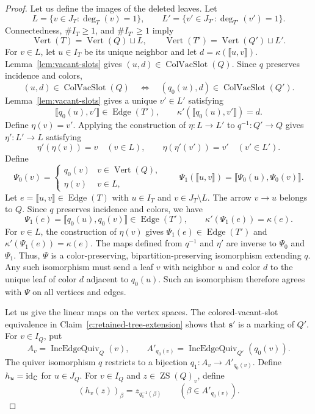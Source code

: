 \begin{proof}
 Let us define the images of the deleted leaves.
Let
\[
 L=\{v\in J_T:\deg_T(v)=1\},\qquad
 L'=\{v'\in J_{T'}:\deg_{T'}(v')=1\}.
\]
Connectedness, $\#I_T\ge1$, and $\#I_{T'}\ge1$ imply
\[
 \operatorname{Vert}(T)=\operatorname{Vert}(Q)\sqcup L,\qquad
 \operatorname{Vert}(T')=\operatorname{Vert}(Q')\sqcup L'.
\]
For $v\in L$, let $u\in I_T$ be its unique neighbor and let
$d=\kappa(\llbracket u,v\rrbracket)$.
Lemma~\ref{lem:vacant-slots} gives $(u,d)\in\operatorname{ColVacSlot}(Q)$.
Since $q$ preserves incidence and colors,
\[
 (u,d)\in\operatorname{ColVacSlot}(Q)
 \quad\Longleftrightarrow\quad
 (q_0(u),d)\in\operatorname{ColVacSlot}(Q').
\]
Lemma~\ref{lem:vacant-slots} gives a unique $v'\in L'$ satisfying
\[
 \llbracket q_0(u),v'\rrbracket\in\operatorname{Edge}(T'),\qquad
 \kappa'(\llbracket q_0(u),v'\rrbracket)=d.
\]
Define $\eta(v)=v'$.
Applying the construction of $\eta:L\to L'$ to $q^{-1}:Q'\to Q$ gives $\eta':L'\to L$ satisfying
\[
 \eta'(\eta(v))=v\quad(v\in L),\qquad
 \eta(\eta'(v'))=v'\quad(v'\in L').
\]
Define
\[
 \Psi_0(v)=
 \begin{cases}
 q_0(v)&v\in\operatorname{Vert}(Q),\\
 \eta(v)&v\in L,
 \end{cases}
 \qquad
 \Psi_1(\llbracket u,v\rrbracket)
 =\llbracket\Psi_0(u),\Psi_0(v)\rrbracket.
\]
Let $e=\llbracket u,v\rrbracket\in\operatorname{Edge}(T)$ with $u\in I_T$ and $v\in J_T\setminus L$.
The arrow $v\to u$ belongs to $Q$.
Since $q$ preserves incidence and colors, we have
\[
 \Psi_1(e)=\llbracket q_0(u),q_0(v)\rrbracket\in\operatorname{Edge}(T'),\qquad
 \kappa'(\Psi_1(e))=\kappa(e).
\]
For $v\in L$, the construction of $\eta(v)$ gives $\Psi_1(e)\in\operatorname{Edge}(T')$ and $\kappa'(\Psi_1(e))=\kappa(e)$.
The maps defined from $q^{-1}$ and $\eta'$ are inverse to $\Psi_0$ and $\Psi_1$.
Thus, $\Psi$ is a color-preserving, bipartition-preserving isomorphism extending $q$.
Any such isomorphism must send a leaf $v$ with neighbor $u$ and color $d$ to the unique leaf of color $d$ adjacent to $q_0(u)$.
Such an isomorphism therefore agrees with $\Psi$ on all vertices and edges.

 Let us give the linear maps on the vertex spaces.
The colored-vacant-slot equivalence in Claim~\ref{c:retained-tree-extension} shows that $\mathbf s'$ is a marking of $Q'$.
For $v\in I_Q$, put
\[
 A_v=\operatorname{IncEdgeQuiv}_Q(v),\qquad
 A'_{q_0(v)}=\operatorname{IncEdgeQuiv}_{Q'}(q_0(v)).
\]
The quiver isomorphism $q$ restricts to a bijection
$q_1:A_v\to A'_{q_0(v)}$.
Define $h_u=\operatorname{id}_{\mathbb C}$ for $u\in J_Q$.
For $v\in I_Q$ and $z\in\operatorname{ZS}(Q)_v$, define
\begin{equation}\label{eq:zero-sum-transport}
 (h_v(z))_\beta=z_{q_1^{-1}(\beta)}
 \qquad(\beta\in A'_{q_0(v)}).
\end{equation}


\end{proof}
